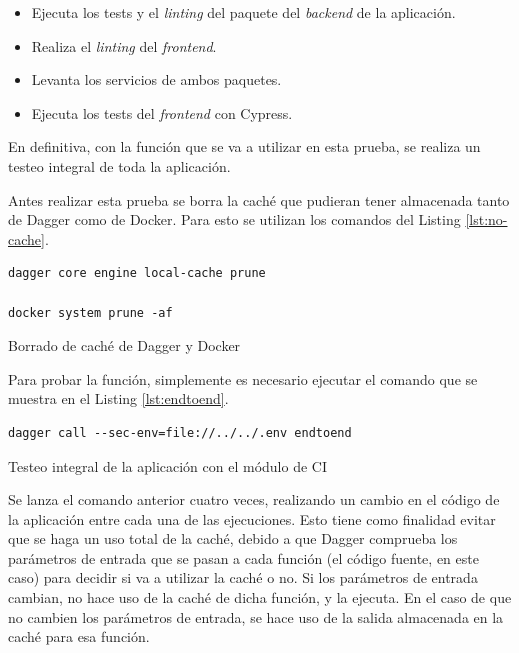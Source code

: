 \begin{itemize}
  \item Ejecuta los tests y el \textit{linting} del paquete del \textit{backend} de la aplicación.
  \item Realiza el \textit{linting} del \textit{frontend}.
  \item Levanta los servicios de ambos paquetes.
  \item Ejecuta los tests del \textit{frontend} con Cypress.
\end{itemize}

En definitiva, con la función que se va a utilizar en esta prueba, se realiza un testeo integral de toda la aplicación.

Antes realizar esta prueba se borra la caché que pudieran tener almacenada tanto de Dagger como de Docker. Para esto se utilizan los comandos del Listing \ref{lst:no-cache}.

\begin{listing}[!ht]
  \begin{verbatim}
dagger core engine local-cache prune

docker system prune -af
\end{verbatim}
\caption{Borrado de caché de Dagger y Docker}
\label{lst:no-cache}
\end{listing}

Para probar la función, simplemente es necesario ejecutar el comando que se muestra en el Listing \ref{lst:endtoend}.

\begin{listing}[!ht]
  \begin{verbatim}
dagger call --sec-env=file://../../.env endtoend
\end{verbatim}
\caption{Testeo integral de la aplicación con el módulo de CI}
\label{lst:endtoend}
\end{listing}

Se lanza el comando anterior cuatro veces, realizando un cambio en el código de la aplicación entre cada una de las ejecuciones. Esto tiene como finalidad evitar que se haga un uso total de la caché, debido a que Dagger comprueba los parámetros de entrada que se pasan a cada función (el código fuente, en este caso) para decidir si va a utilizar la caché o no. Si los parámetros de entrada cambian, no hace uso de la caché de dicha función, y la ejecuta. En el caso de que no cambien los parámetros de entrada, se hace uso de la salida almacenada en la caché para esa función.

